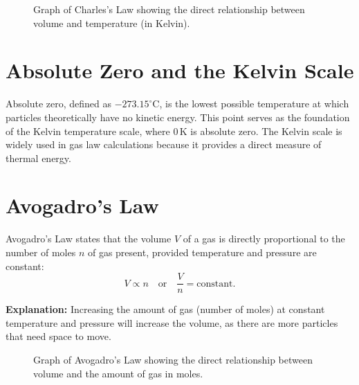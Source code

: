 \documentclass{report}
\begin{document}
\begin{figure}[h]
	\centering
	\caption{Graph of Charles's Law showing the direct relationship between volume and temperature (in Kelvin).}
\end{figure}

\section{Absolute Zero and the Kelvin Scale}
Absolute zero, defined as \(-273.15^\circ\text{C}\), is the lowest possible temperature at which particles theoretically have no kinetic energy. This point serves as the foundation of the Kelvin temperature scale, where \(0 \, \text{K}\) is absolute zero. The Kelvin scale is widely used in gas law calculations because it provides a direct measure of thermal energy.

\section{Avogadro's Law}
Avogadro's Law states that the volume \( V \) of a gas is directly proportional to the number of moles \( n \) of gas present, provided temperature and pressure are constant:
\[
	V \propto n \quad \text{or} \quad \frac{V}{n} = \text{constant}.
\]

\noindent \textbf{Explanation:} Increasing the amount of gas (number of moles) at constant temperature and pressure will increase the volume, as there are more particles that need space to move.

\begin{figure}[h]
	\centering
	\caption{Graph of Avogadro's Law showing the direct relationship between volume and the amount of gas in moles.}
\end{figure}
\end{document}

